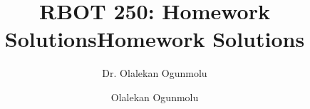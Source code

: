 \documentclass[letterpaper, 10 pt, journal, twoside]{IEEEtran}
\title{RBOT 250: Homework Solutions}
\author{Dr. Olalekan Ogunmolu}
\theoremstyle{remark}
\theoremstyle{definition}
\begin{document}
	\maketitle
	
	
	\title{Homework Solutions}
	
	\author{Olalekan Ogunmolu}




\providecommand\BIBentryALTinterwordstretchfactor{2.5}

	
\end{document}
